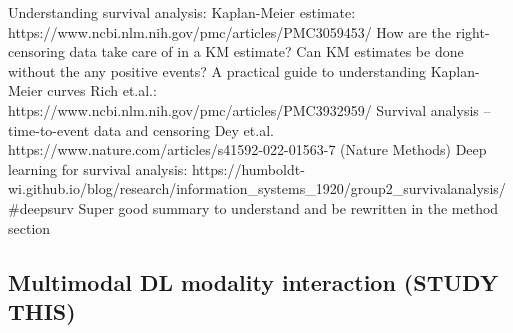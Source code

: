 \documentclass{article}%
\begin{document}
\newline%
\newline%
%
%
\newline%
\newline%
%
Understanding survival analysis: Kaplan{-}Meier estimate: %
\newline%
\newline%
%
https://www.ncbi.nlm.nih.gov/pmc/articles/PMC3059453/ %
\newline%
\newline%
%
How are the right{-}censoring data take care of in a KM estimate? %
\newline%
\newline%
%
Can KM estimates be done without the any positive events? %
\newline%
\newline%
%
A practical guide to understanding Kaplan{-}Meier curves %
\newline%
\newline%
%
Rich et.al.: https://www.ncbi.nlm.nih.gov/pmc/articles/PMC3932959/ %
\newline%
\newline%
%
Survival analysis – time{-}to{-}event data and censoring %
\newline%
\newline%
%
Dey et.al. https://www.nature.com/articles/s41592{-}022{-}01563{-}7 (Nature Methods) %
\newline%
\newline%
%
Deep learning for survival analysis: %
\newline%
\newline%
%
https://humboldt{-}wi.github.io/blog/research/information\_systems\_1920/group2\_survivalanalysis/\#deepsurv %
\newline%
\newline%
%
Super good summary to understand and be rewritten in the method section %
\newline%
\newline%
%
%
\newline%
\newline%
%
\subsection{Multimodal DL modality interaction (STUDY THIS) }%
\label{subsec:MultimodalDLmodalityinteraction(STUDYTHIS)}%
\end{document}
